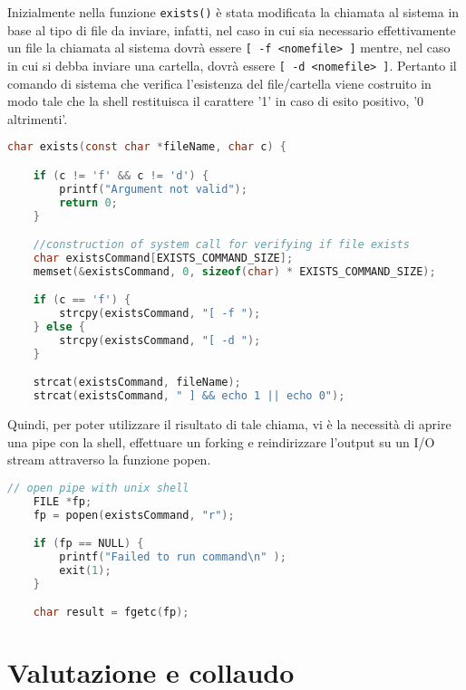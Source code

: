 \documentclass[11pt,fleqn]{book} %
\begin{document}
Inizialmente nella funzione \texttt{exists()} è stata modificata la chiamata al sistema in base al tipo di file da inviare, infatti, nel caso in cui sia necessario effettivamente un file la chiamata al sistema dovrà essere \texttt{[ -f <nomefile> ]} mentre, nel caso in cui si debba inviare una cartella, dovrà essere \texttt{[ -d <nomefile> ]}.
Pertanto il comando di sistema che verifica l'esistenza del file/cartella viene costruito in modo tale che la shell restituisca il carattere '1' in caso di esito positivo, '0 altrimenti'.
\begin{lstlisting}[language=C]
char exists(const char *fileName, char c) {

	if (c != 'f' && c != 'd') {
		printf("Argument not valid");
		return 0;
	}

	//construction of system call for verifying if file exists
	char existsCommand[EXISTS_COMMAND_SIZE];
	memset(&existsCommand, 0, sizeof(char) * EXISTS_COMMAND_SIZE);

	if (c == 'f') {
		strcpy(existsCommand, "[ -f ");
	} else {
		strcpy(existsCommand, "[ -d ");
	}

	strcat(existsCommand, fileName);
	strcat(existsCommand, " ] && echo 1 || echo 0");
\end{lstlisting}

Quindi, per poter utilizzare il risultato di tale chiama, vi è la necessità di aprire una pipe con la shell, effettuare un forking e reindirizzare l'output su un I/O stream attraverso la funzione popen.

\begin{lstlisting}[language=C]
	// open pipe with unix shell
	FILE *fp;
	fp = popen(existsCommand, "r");

	if (fp == NULL) {
    	printf("Failed to run command\n" );
    	exit(1);
  	}

  	char result = fgetc(fp);
\end{lstlisting}



\chapter{Valutazione e collaudo}
\end{document}

